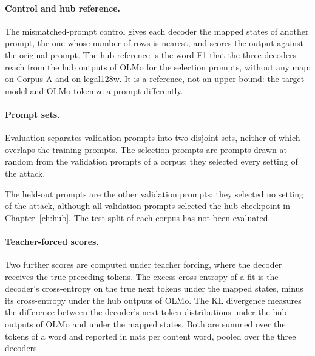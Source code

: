 \paragraph{Control and hub reference.} The mismatched-prompt control gives each decoder the mapped states of another prompt, the one whose number of rows is nearest, and scores the output against the original prompt. %
The hub reference is the word-F1 that the three decoders reach from the hub outputs of OLMo for the selection prompts, without any map:  on Corpus A and  on legal128w. %
It is a reference, not an upper bound: the target model and OLMo tokenize a prompt differently.

\paragraph{Prompt sets.} Evaluation separates validation prompts into two disjoint sets, neither of which overlaps the training prompts.
The selection prompts are  prompts drawn at random from the  validation prompts of a corpus; they selected every setting of the attack. %

The held-out prompts are the other  validation prompts; they selected no setting of the attack, although all  validation prompts selected the hub checkpoint in Chapter~\ref{ch:hub}. %
The test split of each corpus has not been evaluated.

\paragraph{Teacher-forced scores.} Two further scores are computed under teacher forcing, where the decoder receives the true preceding tokens.
The excess cross-entropy of a fit is the decoder's cross-entropy on the true next tokens under the mapped states, minus its cross-entropy under the hub outputs of OLMo.
The KL divergence measures the difference between the decoder's next-token distributions under the hub outputs of OLMo and under the mapped states.
Both are summed over the tokens of a word and reported in nats per content word, pooled over the three decoders. %

